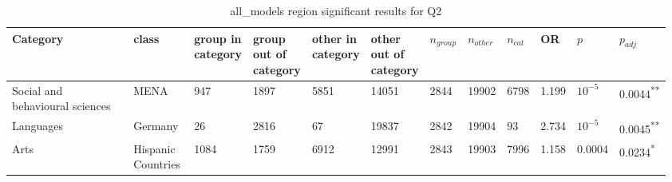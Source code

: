 \clearpage
\begin{landscape}
\begin{table}[p]
\centering
\caption{all_models region significant results for Q2}
\label{tab:appendix-significant-q2-all_models-region}
\scriptsize
\renewcommand{\arraystretch}{0.92}
\setlength{\tabcolsep}{2pt}
\begin{tabular}{p{0.35\linewidth}p{0.1\linewidth}p{0.05\linewidth}p{0.05\linewidth}p{0.05\linewidth}p{0.05\linewidth}p{0.05\linewidth}p{0.05\linewidth}p{0.05\linewidth}p{0.05\linewidth}p{0.05\linewidth}p{0.06\linewidth}}
\toprule
\textbf{Category} & \textbf{class} & \textbf{group in category} & \textbf{group out of category} & \textbf{other in category} & \textbf{other out of category} & \textbf{$n_{group}$} & \textbf{$n_{other}$} & \textbf{$n_{cat}$} & \textbf{OR} & \textbf{$p$} & \textbf{$p_{adj}$} \\
\midrule
Social and behavioural sciences & MENA & 947 & 1897 & 5851 & 14051 & 2844 & 19902 & 6798 & 1.199 & $10^{-5}$ & 0.0044\textsuperscript{**} \\
Languages & Germany & 26 & 2816 & 67 & 19837 & 2842 & 19904 & 93 & 2.734 & $10^{-5}$ & 0.0045\textsuperscript{**} \\
Arts & Hispanic Countries & 1084 & 1759 & 6912 & 12991 & 2843 & 19903 & 7996 & 1.158 & 0.0004 & 0.0234\textsuperscript{*} \\
\bottomrule
\end{tabular}
\end{table}
\end{landscape}
